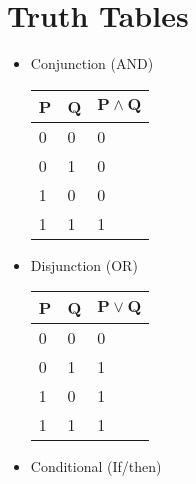 \documentclass{report}
\begin{document}
	\section{Truth Tables}
	\begin{itemize}\addtolength{\leftskip}{2em}
	\item Conjunction (AND)\newline\newline
 			\bgroup
			\def\arraystretch{1.5}%
			\small\begin{tabular}{ | l | l | p{1.25cm} |}
				
				\hline
				\textbf{P}& 
				\textbf{Q}&
				$\mathbf{P\wedge Q}$\\
				\hline
	        	
	        	0& 
				0&
				0\\
				\hline
				
	        	0& 
				1&
				0\\
				\hline
				
	        	1& 
				0&
				0\\
				\hline
				
	        	1& 
				1&
				1\\
				\hline
			\end{tabular}
			\egroup
	\item Disjunction (OR)\newline\newline
 			\bgroup
			\def\arraystretch{1.5}%
			\small\begin{tabular}{ | l | l | p{1.25cm} |}
				
				\hline
				\textbf{P}& 
				\textbf{Q}&
				$\mathbf{P\vee Q}$\\
				\hline
	        	
	        	0& 
				0&
				0\\
				\hline
				
	        	0& 
				1&
				1\\
				\hline
				
	        	1& 
				0&
				1\\
				\hline
				
	        	1& 
				1&
				1\\
				\hline
			\end{tabular}
			\egroup
		\item Conditional (If/then)\newline\newline
	 			\bgroup
				\def\arraystretch{1.5}%
				\small\begin{tabular}{ | l | l | p{1.25cm} |}
					

\end{tabular}
\end{itemize}
\end{document}
